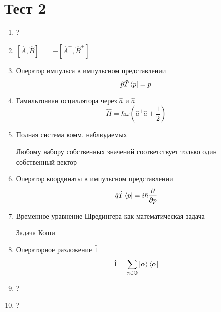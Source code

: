\section*{Тест 2}
\begin{enumerate}
    \item ?
    \item $[\hat A,\hat B]^+=-[\hat A^+,\hat B^+]$
    \item Оператор импульса в импульсном представлении
        $$\hat p \hat T\bra{p}=p$$
    \item Гамильтониан осциллятора через $\hat a$ и $\hat a^+$
        $$\hat H=\hbar\omega(\hat a^+\hat a+\frac{1}{2})$$
    \item Полная система комм. наблюдаемых

        Любому набору собственных значений соответствует только один 
        собственный вектор
    \item Оператор координаты в импульсном представлении
        $$\hat q\hat T\bra{p}=i\hbar\frac{\partial}{\partial p}$$
    \item Временное уравнение Шредингера как математическая задача

        Задача Коши
    \item Операторное разложение $\hat 1$
        $$\hat 1=\sum_{\alpha\in\mathbb Q}\ket{\alpha}\bra{\alpha}$$
    \item ?
    \item ?
\end{enumerate}
